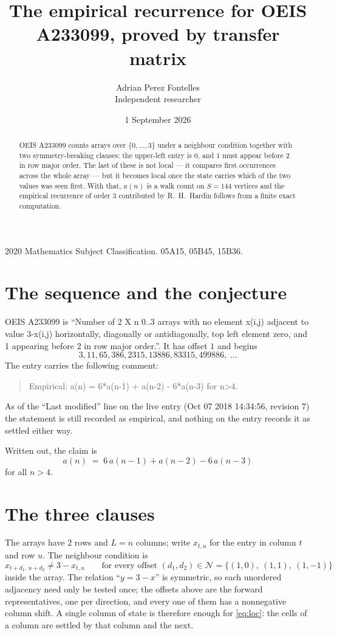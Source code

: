 \documentclass[11pt,a4paper]{article}
\title{The empirical recurrence for OEIS A233099, proved by transfer matrix}
\author{Adrian Perez Fontelles\\ \small Independent researcher}
\date{1 September 2026}
\theoremstyle{plain}
\theoremstyle{definition}
\begin{document}
\maketitle

\begin{abstract}
OEIS A233099 counts arrays over $\{0,\dots,3\}$ under a neighbour condition together with
two symmetry-breaking clauses: the upper-left entry is $0$, and $1$ must appear before
$2$ in row major order. The last of these is not local --- it compares first occurrences
across the whole array --- but it becomes local once the state carries which of the two values
was seen first. With that, $a(n)$ is a walk count on $S=144$ vertices and the empirical
recurrence of order $3$ contributed by R.~H.~Hardin follows from a finite exact
computation.
\end{abstract}

\noindent\small 2020 Mathematics Subject Classification. 05A15, 05B45, 15B36.\normalsize

\section{The sequence and the conjecture}

OEIS A233099 is ``Number of 2 X n 0..3 arrays with no element x(i,j) adjacent to value 3-x(i,j) horizontally, diagonally or antidiagonally, top left element zero, and 1 appearing before 2 in row major order.''. It has offset $1$ and begins
\[
3, 11, 65, 386, 2315, 13886, 83315, 499886,\ \dots
\]
The entry carries the following comment:
\begin{quote}\small
Empirical: a(n) = 6*a(n-1) + a(n-2) - 6*a(n-3) for n>4.
\end{quote}
As of the ``Last modified'' line on the live entry (Oct 07 2018 14:34:56, revision 7) the statement is
still recorded as empirical, and nothing on the entry records it as settled either way.

Written out, the claim is
\begin{equation}\label{eq:conj}
a(n)\;=\;6\,a(n-1) + a(n-2) - 6\,a(n-3)
\end{equation}
for all $n>4$.

\section{The three clauses}

The arrays have $2$ rows and $L=n$ columns; write $x_{t,u}$ for the entry in
column $t$ and row $u$. The neighbour condition is
\begin{equation}\label{eq:loc}
x_{t+d_1,\,u+d_2}\ne 3-x_{t,u}\qquad\text{for every offset }(d_1,d_2)\in\mathcal N=\{(1,0),\ (1,1),\ (1,-1)\}
\end{equation}
inside the array. The relation ``$y=3-x$'' is symmetric, so each unordered adjacency need
only be tested once; the offsets above are the forward representatives, one per direction,
and every one of them has a nonnegative column shift. A single column of state is therefore
enough for \eqref{eq:loc}: the cells of a column are settled by that column and the next.
\end{document}
